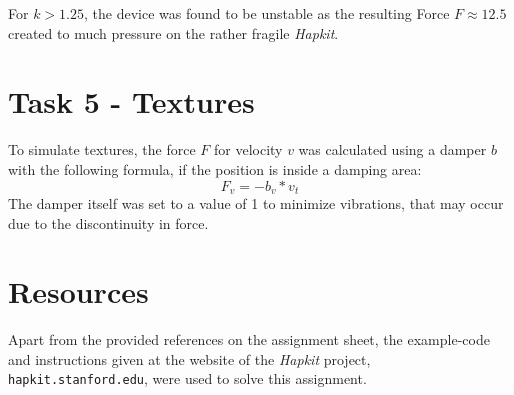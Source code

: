   \begin{figure}[H]
    \centering
  \end{figure}

  For $k > 1.25$, the device was found to be unstable as the resulting Force $F \approx 12.5$ created to much pressure on the rather fragile \textit{Hapkit}.

  \section*{Task 5 - Textures}

  To simulate textures, the force $F$ for velocity $v$ was calculated using a damper $b$ with the following formula, if the position is inside a damping area:
  \begin{equation*}
    F_{v} = -b_{v} * v_{t}
  \end{equation*}
  The damper itself was set to a value of 1 to minimize vibrations, that may occur due to the discontinuity in force.

  \begin{figure}[H]
    \centering
  \end{figure}

  \section*{Resources}

  Apart from the provided references on the assignment sheet, the example-code and instructions given at the website of the \textit{Hapkit} project,\\ \texttt{hapkit.stanford.edu}, were used to solve this assignment.

